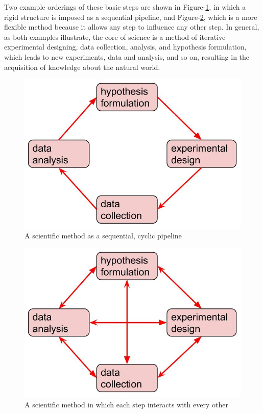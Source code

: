 Two example orderings of these basic steps are shown in 
Figure-\ref{scientific_method_pipeline}, in which a rigid structure is
imposed as a sequential pipeline, and Figure-\ref{scientific_method}, which 
is a more flexible method because it allows any step to influence any other 
step.  In general, as both examples illustrate, the core of science is a
method of iterative experimental designing, data collection, analysis, and 
hypothesis formulation, which leads to new experiments, data and analysis,  
and so on, resulting in the acquisition of knowledge about the natural world.
\begin{figure}
  \includegraphics[scale=0.5]{figures/scientific_method_pipeline}
  \caption{A scientific method as a sequential, cyclic pipeline}
  \label{scientific_method_pipeline}
\end{figure}
\begin{figure}
  \includegraphics[scale=0.5]{figures/scientific_method}
  \caption{A scientific method in which each step interacts with every other}
  \label{scientific_method}
\end{figure}

